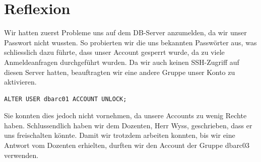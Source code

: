 \documentclass[10pt]{article}
\begin{document}
\section{Reflexion}
Wir hatten zuerst Probleme uns auf dem DB-Server anzumelden, da wir unser Passwort nicht wussten. So 
probierten wir die uns bekannten Passwörter aus, was schliesslich dazu führte, dass unser Account
gesperrt wurde, da zu viele Anmeldeanfragen durchgeführt wurden. Da wir auch keinen SSH-Zugriff auf diesen 
Server hatten, beauftragten wir eine andere Gruppe unser Konto zu aktivieren.
\begin{lstlisting}[style=sql]
ALTER USER dbarc01 ACCOUNT UNLOCK;
\end{lstlisting}
Sie konnten dies jedoch nicht vornehmen, da unsere Accounts zu wenig Rechte haben. Schlussendlich 
haben wir dem Dozenten, Herr Wyss, geschrieben, dass er uns freischalten könnte. Damit wir trotzdem 
arbeiten konnten, bis wir eine Antwort vom Dozenten erhielten, durften wir den Account der Gruppe dbarc03 
verwenden.


\end{document}
